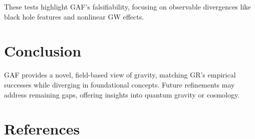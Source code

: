 \documentclass{article}
\begin{document}
These tests highlight GAF's falsifiability, focusing on observable divergences like black hole features and nonlinear GW effects.

\clearpage

\section{Conclusion}

GAF provides a novel, field-based view of gravity, matching GR's empirical successes while diverging in foundational concepts. Future refinements may address remaining gaps, offering insights into quantum gravity or cosmology.

\section{References}
\end{document}
